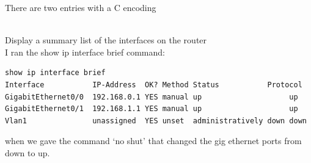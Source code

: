 \documentclass[../EngineeringJournal_CDavis.tex]{subfiles}
\begin{document}
There are two entries with a C encoding

\\
Display a summary list of the interfaces on the router
\\I ran the show ip interface brief command:

\begin{mdframed}
\scriptsize
\begin{verbatim}
show ip interface brief
Interface           IP-Address  OK? Method Status           Protocol 
GigabitEthernet0/0  192.168.0.1 YES manual up                    up 
GigabitEthernet0/1  192.168.1.1 YES manual up                    up 
Vlan1               unassigned  YES unset  administratively down down
\end{verbatim}
\normalsize
\end{mdframed}

when we gave the command `no shut' that changed the gig ethernet ports from down to up.
\end{document}
